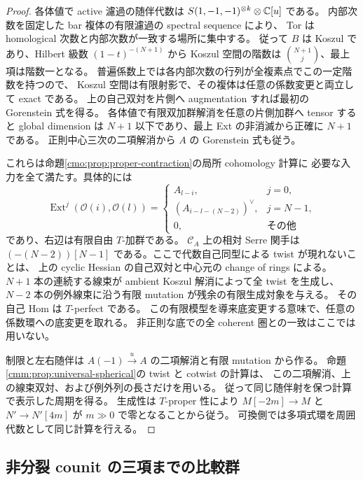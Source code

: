 \begin{proof}
各体値で active 濾過の随伴代数は
$S(1,-1,-1)^{\otimes k}\otimes\mathbb C[u]$ である。
内部次数を固定した bar 複体の有限濾過の spectral sequence により、
Tor は homological 次数と内部次数が一致する場所に集中する。
従って $B$ は Koszul であり、Hilbert 級数 $(1-t)^{-(N+1)}$ から
Koszul 空間の階数は $\binom{N+1}{j}$、最上項は階数一となる。
普遍係数上では各内部次数の行列が全複素点でこの一定階数を持つので、
Koszul 空間は有限射影で、その複体は任意の係数変更と両立して exact である。
上の自己双対を片側へ augmentation すれば最初の Gorenstein 式を得る。
各体値で有限双加群解消を任意の片側加群へ tensor すると global dimension は
$N+1$ 以下であり、最上 Ext の非消滅から正確に $N+1$ である。
正則中心三次の二項解消から $A$ の Gorenstein 式も従う。

これらは命題\ref{cmo:prop:proper-contraction}の局所 cohomology 計算に
必要な入力を全て満たす。具体的には
\[
 \operatorname{Ext}^j(\mathcal O(i),\mathcal O(l))=
 \begin{cases}
  A_{l-i},&j=0,\\
  (A_{i-l-(N-2)})^\vee,&j=N-1,\\
  0,&\text{その他}
 \end{cases}
\]
であり、右辺は有限自由 $T$-加群である。
$\mathcal C_A$ 上の相対 Serre 関手は
$(-(N-2))[N-1]$ である。ここで代数自己同型による twist が現れないことは、
上の cyclic Hessian の自己双対と中心元の change of rings による。
$N+1$ 本の連続する線束が ambient Koszul 解消によって全 twist を生成し、
$N-2$ 本の例外線束に沿う有限 mutation が残余の有限生成対象を与える。
その自己 Hom は $T$-perfect である。
この有限模型を導来底変更する意味で、任意の係数環への底変更を取れる。
非正則な底での全 coherent 圏との一致はここでは用いない。

制限と左右随伴は $A(-1)\xrightarrow{u}A$ の二項解消と有限 mutation から作る。
命題\ref{cmm:prop:universal-spherical}の twist と cotwist の計算は、
この二項解消、上の線束双対、および例外列の長さだけを用いる。
従って同じ随伴射を保つ計算で表示した周期を得る。
生成性は $T$-proper 性により
$M[-2m]\to M$ と $N'\to N'[4m]$ が $m\gg0$ で零となることから従う。
可換側では多項式環を周囲代数として同じ計算を行える。
\end{proof}

\subsection{非分裂 counit の三項までの比較群}

